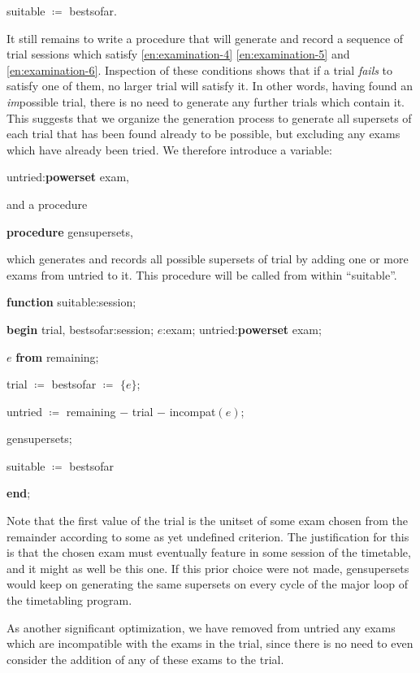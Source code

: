 \documentclass[twoside,11pt]{book}
\begin{document}
\quad suitable $\coloneq$ bestsofar.

It still remains to write a procedure that will generate and record a sequence of trial sessions which satisfy \ref{en:examination-4} \ref{en:examination-5} and \ref{en:examination-6}. Inspection of these conditions shows that if a trial \textit{fails} to satisfy one of them, no larger trial will satisfy it. In other words, having found an \textit{im}possible trial, there is no need to generate any further trials which contain it. This suggests that we organize the generation process to generate all supersets of each trial that has been found already to be possible, but excluding any exams which have already been tried. We therefore introduce a variable:

\quad untried:\textbf{powerset} exam,

\noindent
and a procedure

\quad \textbf{procedure} gensupersets,

\noindent
which generates and records all possible supersets of trial by adding one or more exams from untried to it. This procedure will be called from within ``suitable''.

\quad \textbf{function} suitable:session;

\quad \quad \textbf{begin} trial, bestsofar:session; $e$:exam; untried:\textbf{powerset} exam;

\quad \quad \quad $e$ \textbf{from} remaining;

\quad \quad \quad trial $\coloneq$ bestsofar $\coloneq$ $\{e\}$;

\quad \quad \quad untried $\coloneq$ remaining $-$ trial $-$ incompat$(e)$;

\quad \quad \quad gensupersets;

\quad \quad \quad suitable $\coloneq$ bestsofar

\quad \quad \textbf{end};

\noindent
Note that the first value of the trial is the unitset of some exam chosen from the remainder according to some as yet undefined criterion. The justification for this is that the chosen exam must eventually feature in some session of the timetable, and it might as well be this one. If this prior choice were not made, gensupersets would keep on generating the same supersets on every cycle of the major loop of the timetabling program.

As another significant optimization, we have removed from untried any exams which are incompatible with the exams in the trial, since there is no need to even consider the addition of any of these exams to the trial.
\end{document}

